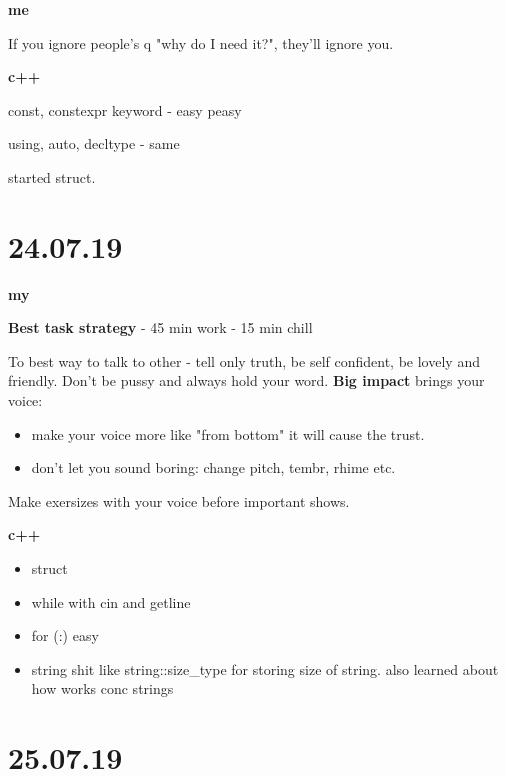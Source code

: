 \documentclass[12pt,a4paper,titlepage]{article}
\begin{document}
\begin{center}
    \large \textbf{me}
\end{center}

If you ignore people's q "why do I need it?", they'll ignore you.

\begin{center}
    \large \textbf{c++}
\end{center}

const, constexpr keyword - easy peasy

using, auto, decltype - same

started struct.

\newpage
\section{24.07.19}
\begin{center}
    \large \textbf{my}
\end{center}

\textbf{Best task strategy} - 45 min work - 15 min chill 

To best way to talk to other - tell only truth, be self confident, be lovely and friendly. Don't
be pussy and always hold your word. \textbf{Big impact} brings your voice:
\begin{itemize}
    \item make your voice more like "from bottom" it will cause the trust.
    \item don't let you sound boring: change pitch, tembr, rhime etc.
\end{itemize}

Make exersizes with your voice before important shows.

\begin{center}
    \large \textbf{c++}
\end{center}

\begin{itemize}
    \item struct
    \item while with cin and getline
    \item for (:) easy
    \item string shit like string::size\_type for storing size of string. also learned about how works conc strings
\end{itemize}

\newpage
\section{25.07.19}
\end{document}
